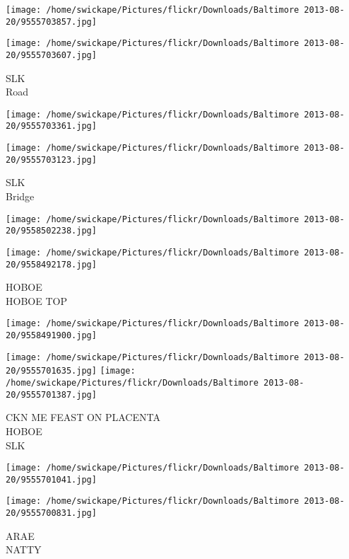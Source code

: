 \documentclass[10pt,letterpaper]{article}
\begin{document}
\texttt{[image: /home/swickape/Pictures/flickr/Downloads/Baltimore 2013-08-20/9555703857.jpg]}

\vspace{0.25in}
\texttt{[image: /home/swickape/Pictures/flickr/Downloads/Baltimore 2013-08-20/9555703607.jpg]}

SLK\\
Road\\
\pagebreak

\texttt{[image: /home/swickape/Pictures/flickr/Downloads/Baltimore 2013-08-20/9555703361.jpg]}

\vspace{0.25in}
\texttt{[image: /home/swickape/Pictures/flickr/Downloads/Baltimore 2013-08-20/9555703123.jpg]}

SLK\\
Bridge\\
\pagebreak

\texttt{[image: /home/swickape/Pictures/flickr/Downloads/Baltimore 2013-08-20/9558502238.jpg]}

\vspace{0.25in}
\texttt{[image: /home/swickape/Pictures/flickr/Downloads/Baltimore 2013-08-20/9558492178.jpg]}

HOBOE\\
HOBOE TOP\\
\pagebreak

\texttt{[image: /home/swickape/Pictures/flickr/Downloads/Baltimore 2013-08-20/9558491900.jpg]}

\vspace{0.25in}
\texttt{[image: /home/swickape/Pictures/flickr/Downloads/Baltimore 2013-08-20/9555701635.jpg]}
\texttt{[image: /home/swickape/Pictures/flickr/Downloads/Baltimore 2013-08-20/9555701387.jpg]}

CKN ME FEAST ON PLACENTA\\
HOBOE\\
SLK\\
\pagebreak

\texttt{[image: /home/swickape/Pictures/flickr/Downloads/Baltimore 2013-08-20/9555701041.jpg]}

\vspace{0.25in}
\texttt{[image: /home/swickape/Pictures/flickr/Downloads/Baltimore 2013-08-20/9555700831.jpg]}

ARAE\\
NATTY\\
\pagebreak
\end{document}
